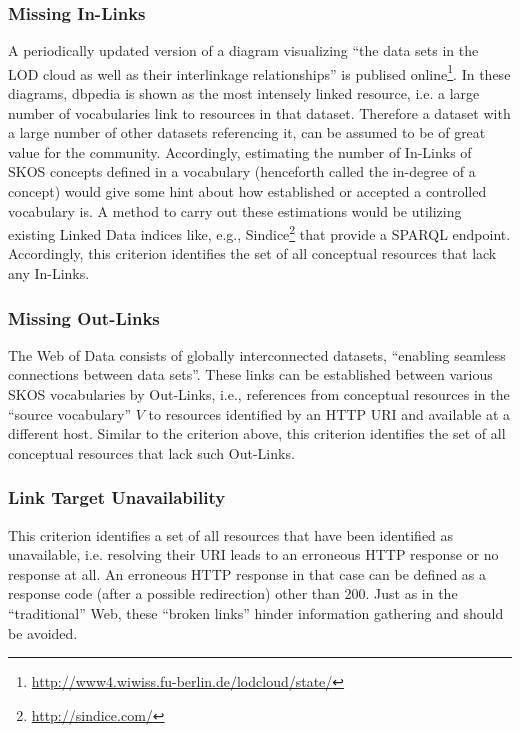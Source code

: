 \subsubsection{Missing In-Links}
A periodically updated version of a diagram visualizing ``the data sets in the LOD cloud as well as their interlinkage relationships'' is publised online\footnote{\url{http://www4.wiwiss.fu-berlin.de/lodcloud/state/}}. In these diagrams, dbpedia is shown as the most intensely linked resource, i.e. a large number of vocabularies link to resources in that dataset. Therefore a dataset with a large number of other datasets referencing it, can be assumed to be of great value for the community. Accordingly, estimating the number of In-Links of SKOS concepts defined in a vocabulary (henceforth called the in-degree of a concept) would give some hint about how established or accepted a controlled vocabulary is. A method to carry out these estimations would be utilizing existing Linked Data indices like, e.g., Sindice\footnote{\url{http://sindice.com/}} that provide a SPARQL endpoint. Accordingly, this criterion identifies the set of all conceptual resources that lack any In-Links.

\subsubsection{Missing Out-Links}
The Web of Data consists of globally interconnected datasets, ``enabling seamless connections between data sets''\cite{Heath2011}. These links can be established between various SKOS vocabularies by Out-Links, i.e., references from conceptual resources in the ``source vocabulary'' $V$ to resources identified by an HTTP URI and available at a different host. Similar to the criterion above, this criterion identifies the set of all conceptual resources that lack such Out-Links.


\subsubsection{Link Target Unavailability}
This criterion identifies a set of all resources that have been identified as unavailable, i.e. resolving their URI leads to an erroneous HTTP response or no response at all. An erroneous HTTP response in that case can be defined as a response code (after a possible redirection) other than 200. Just as in the ``traditional'' Web, these ``broken links'' hinder information gathering and should be avoided. 

